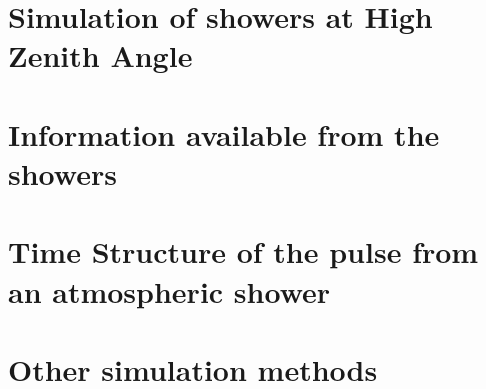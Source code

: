 \CORSIKAtableRE

\CORSIKAtablePART

\CORSIKAtableCHER

\CORSIKAtableSTA


\MORE%

\section{Simulation of showers at High Zenith Angle}

\section{Information available from the showers}

\section{Time Structure of the \Cherenkov pulse from an atmospheric shower}

\section{Other simulation methods}
\label{sec:simothers}

\endinput
%
